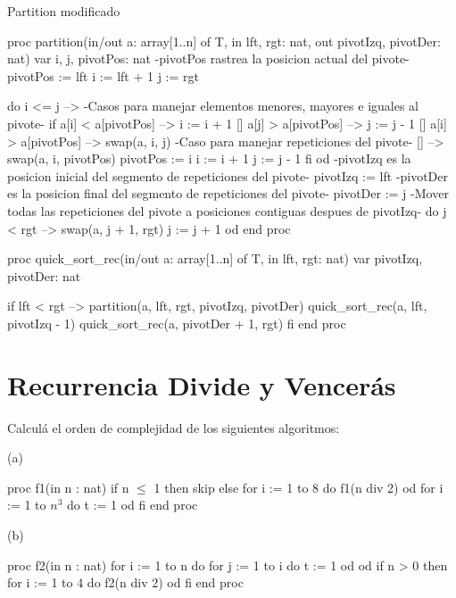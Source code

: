 \begin{codebox}{Partition modificado}
\begin{pascallike}
proc partition(in/out a: array[1..n] of T, in lft, rgt: nat, 
out pivotIzq, pivotDer: nat)
    var i, j, pivotPos: nat
    {-pivotPos rastrea la posicion actual del pivote-}
    pivotPos := lft
    i := lft + 1
    j := rgt

    do i <= j -->
        {-Casos para manejar elementos menores, mayores e iguales al pivote-}
        if a[i] < a[pivotPos] -->
            i := i + 1
        [] a[j] > a[pivotPos] -->
            j := j - 1
        [] a[i] > a[pivotPos] -->
            swap(a, i, j)
        {-Caso para manejar repeticiones del pivote-}
        [] -->
            swap(a, i, pivotPos)
            pivotPos := i
            i := i + 1
            j := j - 1
        fi
    od
    {-pivotIzq es la posicion inicial del segmento de repeticiones del pivote-}
    pivotIzq := lft
    {-pivotDer es la posicion final del segmento de repeticiones del pivote-}
    pivotDer := j
    {-Mover todas las repeticiones del pivote a posiciones contiguas despues 
    de pivotIzq-}
    do j < rgt -->
        swap(a, j + 1, rgt)
        j := j + 1
    od
end proc

proc quick_sort_rec(in/out a: array[1..n] of T, in lft, rgt: nat)
    var pivotIzq, pivotDer: nat

    if lft < rgt -->
        partition(a, lft, rgt, pivotIzq, pivotDer)
        quick_sort_rec(a, lft, pivotIzq - 1)
        quick_sort_rec(a, pivotDer + 1, rgt)
    fi
end proc
\end{pascallike}
\end{codebox}

\section{Recurrencia Divide y Vencerás}

Calculá el orden de complejidad de los siguientes algoritmos:

\begin{codebox}{(a)}
\begin{pascallike}
proc f1(in n : nat)
    if n $\leq$ 1 then skip
    else
        for i := 1 to 8 do 
            f1(n div 2) 
        od
        for i := 1 to $n^3$ do 
            t := 1 
        od
    fi
end proc
\end{pascallike}
\end{codebox}

\begin{codebox}{(b)}
\begin{pascallike}
proc f2(in n : nat)
    for i := 1 to n do
        for j := 1 to i do 
            t := 1 
        od
    od
    if n > 0 then
        for i := 1 to 4 do 
            f2(n div 2) 
        od
    fi
end proc
\end{pascallike}
\end{codebox}

